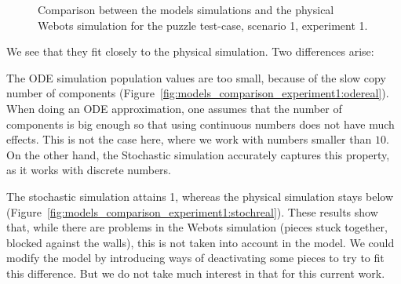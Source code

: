 		\begin{figure}[h!]
			\: %
			\caption{Comparison between the models simulations and the physical Webots simulation for the puzzle test-case, scenario 1, experiment 1.}
		\label{fig:models_comparison_experiment1} %
		\end{figure}
			
		We see that they fit closely to the physical simulation. Two differences arise:
		
		\begin{my_itemize}
			\item The ODE simulation population values are too small, because of the slow copy number of components (Figure~\ref{fig:models_comparison_experiment1:odereal}). When doing an ODE approximation, one assumes that the number of components is big enough so that using continuous numbers does not have much effects. This is not the case here, where we work with numbers smaller than $10$. On the other hand, the Stochastic simulation accurately captures this property, as it works with discrete numbers. 
			\item The stochastic simulation attains 1, whereas the physical simulation stays below (Figure~\ref{fig:models_comparison_experiment1:stochreal}). These results show that, while there are problems in the Webots simulation (pieces stuck together, blocked against the walls), this is not taken into account in the model. We could modify the model by introducing ways of deactivating some pieces to try to fit this difference. But we do not take much interest in that for this current work.
		\end{my_itemize}
		
